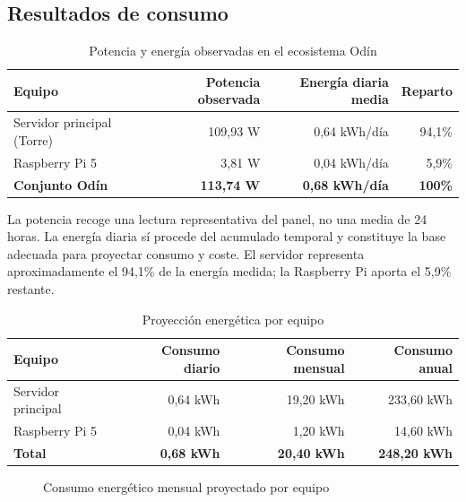 \subsection{Resultados de consumo}
\begin{table}[H]
  \centering
  \caption{Potencia y energía observadas en el ecosistema Odín}
  \label{tab:consumo-observado}
  \begin{tabularx}{\textwidth}{Xrrr}
    \toprule
    Equipo & Potencia observada & Energía diaria media & Reparto \\
    \midrule
    Servidor principal (Torre) & 109,93 W & 0,64 kWh/día & 94,1\% \\
    Raspberry Pi 5 & 3,81 W & 0,04 kWh/día & 5,9\% \\
    \midrule
    \textbf{Conjunto Odín} & \textbf{113,74 W} & \textbf{0,68 kWh/día} & \textbf{100\%} \\
    \bottomrule
  \end{tabularx}
\end{table}

La potencia recoge una lectura representativa del panel, no una media de 24 horas. La energía diaria sí procede del acumulado temporal y constituye la base adecuada para proyectar consumo y coste. El servidor representa aproximadamente el 94,1\% de la energía medida; la Raspberry Pi aporta el 5,9\% restante.

\begin{table}[H]
  \centering
  \caption{Proyección energética por equipo}
  \label{tab:proyeccion-energetica}
  \begin{tabularx}{\textwidth}{Xrrr}
    \toprule
    Equipo & Consumo diario & Consumo mensual & Consumo anual \\
    \midrule
    Servidor principal & 0,64 kWh & 19,20 kWh & 233,60 kWh \\
    Raspberry Pi 5 & 0,04 kWh & 1,20 kWh & 14,60 kWh \\
    \midrule
    \textbf{Total} & \textbf{0,68 kWh} & \textbf{20,40 kWh} & \textbf{248,20 kWh} \\
    \bottomrule
  \end{tabularx}
\end{table}

\begin{figure}[H]
  \centering
  \caption{Consumo energético mensual proyectado por equipo}
  \label{fig:consumo-mensual}
\end{figure}

